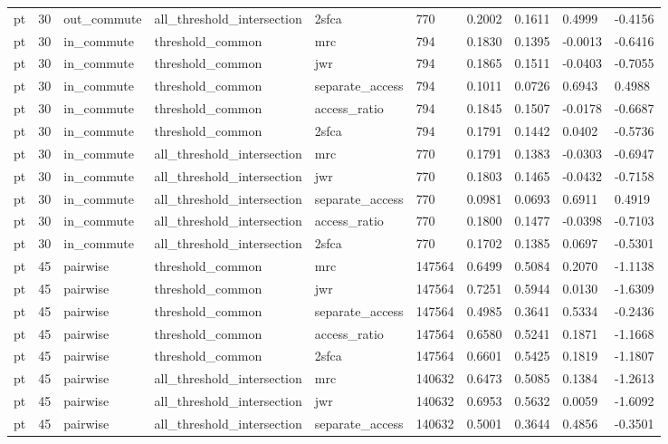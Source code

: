 \begin{table}[htbp]
\begin{tabular}{llllllllll}
pt & 30 & out\_commute & all\_threshold\_intersection & 2sfca & 770 & 0.2002 & 0.1611 & 0.4999 & -0.4156 \\
pt & 30 & in\_commute & threshold\_common & mrc & 794 & 0.1830 & 0.1395 & -0.0013 & -0.6416 \\
pt & 30 & in\_commute & threshold\_common & jwr & 794 & 0.1865 & 0.1511 & -0.0403 & -0.7055 \\
pt & 30 & in\_commute & threshold\_common & separate\_access & 794 & 0.1011 & 0.0726 & 0.6943 & 0.4988 \\
pt & 30 & in\_commute & threshold\_common & access\_ratio & 794 & 0.1845 & 0.1507 & -0.0178 & -0.6687 \\
pt & 30 & in\_commute & threshold\_common & 2sfca & 794 & 0.1791 & 0.1442 & 0.0402 & -0.5736 \\
pt & 30 & in\_commute & all\_threshold\_intersection & mrc & 770 & 0.1791 & 0.1383 & -0.0303 & -0.6947 \\
pt & 30 & in\_commute & all\_threshold\_intersection & jwr & 770 & 0.1803 & 0.1465 & -0.0432 & -0.7158 \\
pt & 30 & in\_commute & all\_threshold\_intersection & separate\_access & 770 & 0.0981 & 0.0693 & 0.6911 & 0.4919 \\
pt & 30 & in\_commute & all\_threshold\_intersection & access\_ratio & 770 & 0.1800 & 0.1477 & -0.0398 & -0.7103 \\
pt & 30 & in\_commute & all\_threshold\_intersection & 2sfca & 770 & 0.1702 & 0.1385 & 0.0697 & -0.5301 \\
pt & 45 & pairwise & threshold\_common & mrc & 147564 & 0.6499 & 0.5084 & 0.2070 & -1.1138 \\
pt & 45 & pairwise & threshold\_common & jwr & 147564 & 0.7251 & 0.5944 & 0.0130 & -1.6309 \\
pt & 45 & pairwise & threshold\_common & separate\_access & 147564 & 0.4985 & 0.3641 & 0.5334 & -0.2436 \\
pt & 45 & pairwise & threshold\_common & access\_ratio & 147564 & 0.6580 & 0.5241 & 0.1871 & -1.1668 \\
pt & 45 & pairwise & threshold\_common & 2sfca & 147564 & 0.6601 & 0.5425 & 0.1819 & -1.1807 \\
pt & 45 & pairwise & all\_threshold\_intersection & mrc & 140632 & 0.6473 & 0.5085 & 0.1384 & -1.2613 \\
pt & 45 & pairwise & all\_threshold\_intersection & jwr & 140632 & 0.6953 & 0.5632 & 0.0059 & -1.6092 \\
pt & 45 & pairwise & all\_threshold\_intersection & separate\_access & 140632 & 0.5001 & 0.3644 & 0.4856 & -0.3501 \\

\end{tabular}
\end{table}
